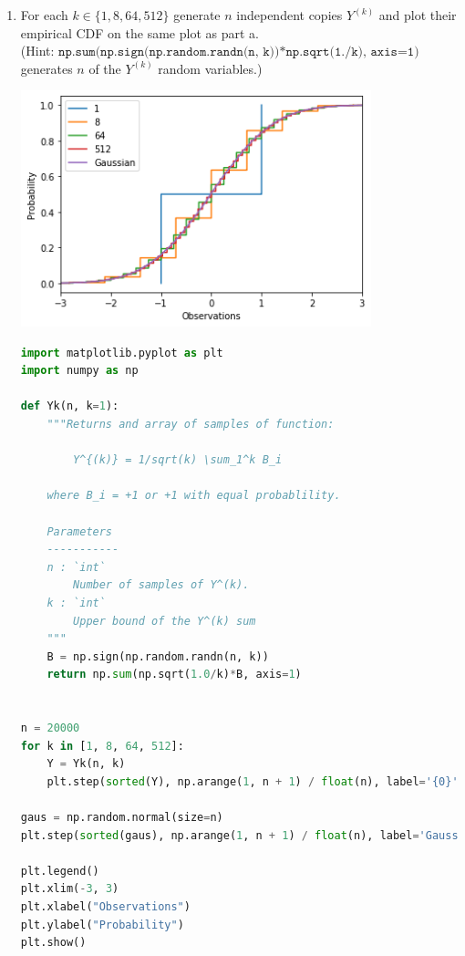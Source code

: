 \documentclass{article}
\newcommand{\1}{\mathbf{1}}
\begin{document}
\begin{enumerate}
    
\item For each $k \in \{1, 8, 64, 512\}$ generate $n$ independent copies $Y^{(k)}$ and plot their empirical CDF on the same plot as part a.\\ (Hint: $\texttt{np.sum(np.sign(np.random.randn(n, k))*np.sqrt(1./k), axis=1)}$ generates $n$ of the $Y^{(k)}$ random variables.) 
    \begin{center}
    \includegraphics[width=4in]{HW0_plots/cumdist2.png}
    \end{center} 
	\begin{lstlisting}[language=Python]
import matplotlib.pyplot as plt
import numpy as np

def Yk(n, k=1):
    """Returns and array of samples of function:
    
        Y^{(k)} = 1/sqrt(k) \sum_1^k B_i
    
    where B_i = +1 or +1 with equal probablility. 
    
    Parameters
    -----------
    n : `int`
        Number of samples of Y^(k). 
    k : `int`
        Upper bound of the Y^(k) sum
    """
    B = np.sign(np.random.randn(n, k))
    return np.sum(np.sqrt(1.0/k)*B, axis=1)


n = 20000
for k in [1, 8, 64, 512]:
    Y = Yk(n, k)
    plt.step(sorted(Y), np.arange(1, n + 1) / float(n), label='{0}'.format(k))

gaus = np.random.normal(size=n)
plt.step(sorted(gaus), np.arange(1, n + 1) / float(n), label='Gaussian')    

plt.legend()
plt.xlim(-3, 3)
plt.xlabel("Observations")
plt.ylabel("Probability")
plt.show()
    \end{lstlisting}
\end{enumerate}
\end{document}
